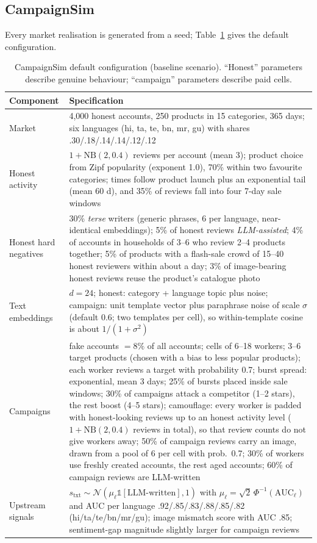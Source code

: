 \documentclass[pdflatex,sn-basic]{sn-jnl}
\theoremstyle{thmstyleone}
\theoremstyle{thmstylethree}
\begin{document}
\subsection{CampaignSim}
Every market realisation is generated from a seed; Table~\ref{tab:sim} gives the default configuration.

\begin{table}[t]
\caption{CampaignSim default configuration (baseline scenario). ``Honest'' parameters describe genuine behaviour; ``campaign'' parameters describe paid cells.}\label{tab:sim}
\small
\begin{tabular}{@{}p{2.8cm}p{8.4cm}@{}}
\toprule
Component & Specification \\
\midrule
Market & 4{,}000 honest accounts, 250 products in 15 categories, 365 days; six languages (hi, ta, te, bn, mr, gu) with shares .30/.18/.14/.14/.12/.12 \\
Honest activity & $1+\mathrm{NB}(2,0.4)$ reviews per account (mean 3); product choice from Zipf popularity (exponent 1.0), 70\% within two favourite categories; times follow product launch plus an exponential tail (mean 60 d), and 35\% of reviews fall into four 7-day sale windows \\
Honest hard negatives & 30\% \emph{terse} writers (generic phrases, 6 per language, near-identical embeddings); 5\% of honest reviews \emph{LLM-assisted}; 4\% of accounts in households of 3--6 who review 2--4 products together; 5\% of products with a flash-sale crowd of 15--40 honest reviewers within about a day; 3\% of image-bearing honest reviews reuse the product's catalogue photo \\
Text embeddings & $d=24$; honest: category + language topic plus noise; campaign: unit template vector plus paraphrase noise of scale $\sigma$ (default 0.6; two templates per cell), so within-template cosine is about $1/(1+\sigma^2)$ \\
Campaigns & fake accounts $=8\%$ of all accounts; cells of 6--18 workers; 3--6 target products (chosen with a bias to less popular products); each worker reviews a target with probability 0.7; burst spread: exponential, mean 3 days; 25\% of bursts placed inside sale windows; 30\% of campaigns attack a competitor (1--2 stars), the rest boost (4--5 stars); camouflage: every worker is padded with honest-looking reviews up to an honest activity level ($1+\mathrm{NB}(2,0.4)$ reviews in total), so that review counts do not give workers away; 50\% of campaign reviews carry an image, drawn from a pool of 6 per cell with prob.\ 0.7; 30\% of workers use freshly created accounts, the rest aged accounts; 60\% of campaign reviews are LLM-written \\
Upstream signals & $s_{\mathrm{txt}}\sim\mathcal N(\mu_{\ell}\mathbb 1[\text{LLM-written}],1)$ with $\mu_\ell=\sqrt2\,\Phi^{-1}(\mathrm{AUC}_\ell)$ and AUC per language .92/.85/.83/.88/.85/.82 (hi/ta/te/bn/mr/gu); image mismatch score with AUC .85; sentiment-gap magnitude slightly larger for campaign reviews \\
\bottomrule
\end{tabular}
\end{table}
\end{document}
